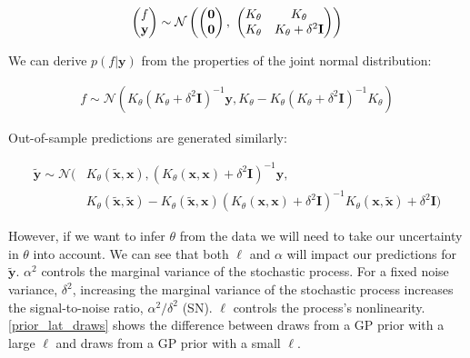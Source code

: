 \documentclass{article}
\newcommand{\lp}{\ensuremath{\left(}}
\newcommand{\rp}{\ensuremath{\right)}}
\begin{document}
\begin{align*} \begin{pmatrix} f\\ \mathbf{y} \\ \end{pmatrix} \sim
\mathcal{N} \lp \begin{pmatrix} \mathbf{0} \\ \mathbf{0} \end{pmatrix} ,\,\,
  \begin{pmatrix} K_\theta &
  K_\theta  \\ K_\theta &
  K_\theta + \delta ^ 2 \mathbf{I}\\ \end{pmatrix} \rp
\end{align*}

We can derive $p(f | \mathbf{y})$ from the properties of the joint normal
distribution: 

\begin{align*}
  f \sim
  \mathcal{N}(K_\theta  (K_\theta +
  \delta ^ 2 \mathbf{I})^{-1}\mathbf{y},  
  K_\theta - K_\theta (K_\theta + \delta ^ 2 \mathbf{I})^{-1}K_\theta)
\end{align*}

Out-of-sample predictions are generated similarly:

\begin{align*} 
  \mathbf{\tilde{y}} \sim
  \mathcal{N}(&K_\theta(\mathbf{\tilde{x}},\mathbf{x}), (K_\theta(\mathbf{x},\mathbf{x}) +
  \delta ^ 2 \mathbf{I})^{-1}\mathbf{y},  
   \\ & K_\theta(\mathbf{\tilde{x}},\mathbf{\tilde{x}}) -K_\theta(\mathbf{\tilde{x}},\mathbf{x}) (K_\theta(\mathbf{x},\mathbf{x}) + \delta ^ 2 \mathbf{I})^{-1}K_\theta(\mathbf{x},\mathbf{\tilde{x}}) + \delta ^ 2 \mathbf{I})
\end{align*}

However, if we want to infer $\theta$ from the data we will need to take our
uncertainty in $\theta$ into account. We can see that both $\ell$ and $\alpha$
will impact our predictions for $\tilde{\mathbf{y}}$.  $\alpha^2$ controls the
marginal variance of the stochastic process. For a fixed noise variance,
$\delta^2$, increasing the marginal variance of the stochastic process
increases the signal-to-noise ratio, $\alpha^2 / \delta^2$ (SN). $\ell$ controls the process's
nonlinearity. \ref{prior_lat_draws} shows the difference between draws from a GP prior
with a large $\ell$ and draws from a GP prior with a small $\ell$.
\end{document}
